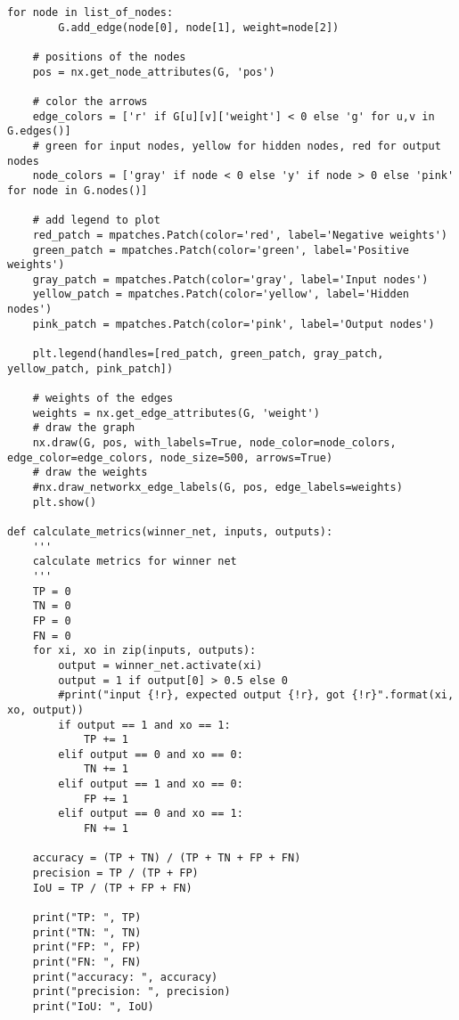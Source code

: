\begin{lstlisting}[style=pythonstyle, caption={Программный код реализации алгоритма NEAT с применением модуля neat-python}, label={lst:pythoncode}]
    for node in list_of_nodes:
        G.add_edge(node[0], node[1], weight=node[2])

    # positions of the nodes
    pos = nx.get_node_attributes(G, 'pos')

    # color the arrows
    edge_colors = ['r' if G[u][v]['weight'] < 0 else 'g' for u,v in G.edges()]
    # green for input nodes, yellow for hidden nodes, red for output nodes
    node_colors = ['gray' if node < 0 else 'y' if node > 0 else 'pink' for node in G.nodes()]

    # add legend to plot
    red_patch = mpatches.Patch(color='red', label='Negative weights')
    green_patch = mpatches.Patch(color='green', label='Positive weights')
    gray_patch = mpatches.Patch(color='gray', label='Input nodes')
    yellow_patch = mpatches.Patch(color='yellow', label='Hidden nodes')
    pink_patch = mpatches.Patch(color='pink', label='Output nodes')

    plt.legend(handles=[red_patch, green_patch, gray_patch, yellow_patch, pink_patch])

    # weights of the edges
    weights = nx.get_edge_attributes(G, 'weight')
    # draw the graph
    nx.draw(G, pos, with_labels=True, node_color=node_colors, edge_color=edge_colors, node_size=500, arrows=True)
    # draw the weights
    #nx.draw_networkx_edge_labels(G, pos, edge_labels=weights)
    plt.show()

def calculate_metrics(winner_net, inputs, outputs):
    '''
    calculate metrics for winner net    
    '''
    TP = 0
    TN = 0
    FP = 0
    FN = 0
    for xi, xo in zip(inputs, outputs):
        output = winner_net.activate(xi)
        output = 1 if output[0] > 0.5 else 0
        #print("input {!r}, expected output {!r}, got {!r}".format(xi, xo, output))    
        if output == 1 and xo == 1:
            TP += 1
        elif output == 0 and xo == 0:
            TN += 1
        elif output == 1 and xo == 0:
            FP += 1
        elif output == 0 and xo == 1:
            FN += 1

    accuracy = (TP + TN) / (TP + TN + FP + FN)
    precision = TP / (TP + FP)
    IoU = TP / (TP + FP + FN)

    print("TP: ", TP)
    print("TN: ", TN)
    print("FP: ", FP)
    print("FN: ", FN)
    print("accuracy: ", accuracy)
    print("precision: ", precision)
    print("IoU: ", IoU)


\end{lstlisting}
